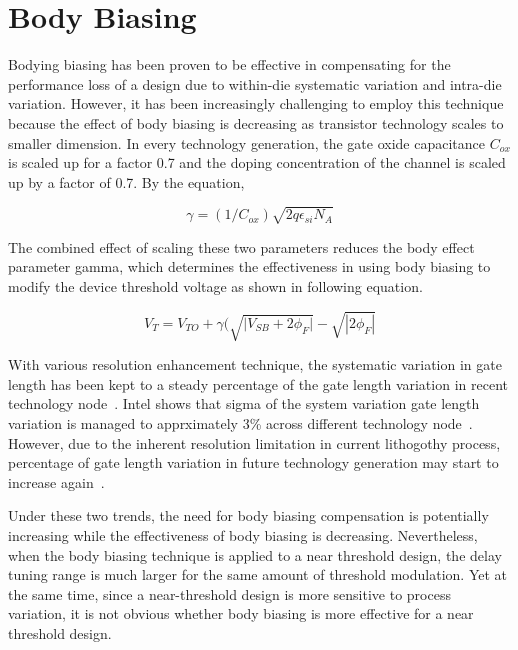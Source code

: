 \section{Body Biasing}
\label{sec:bodybiasing}

Bodying biasing has been proven to be effective in compensating for the
performance loss of a design due to within-die systematic variation and
intra-die variation. However, it has been increasingly challenging to employ
this technique because the effect of body biasing is decreasing as transistor
technology scales to smaller dimension. In every technology generation, the gate
oxide capacitance $C_{ox}$ is scaled up for a factor 0.7 and the doping
concentration of the channel is scaled up by a factor of 0.7. By the equation,

\begin{equation}
\gamma = (1/C_{ox})\sqrt{2q\epsilon_{si}N_A}
\end{equation}

The combined effect of scaling these two parameters reduces the body effect
parameter gamma, which determines the effectiveness in using body biasing to
modify the device threshold voltage as shown in following equation.

\begin{equation}
V_{T} = V_{TO} + \gamma ( \sqrt{ | {V_{SB} + 2\phi_{F} | } } - \sqrt{ | 2\phi_{F} | } 
\end{equation}

With various resolution enhancement technique, the systematic variation in gate length has been kept to a steady percentage of the gate length variation in recent technology node~\cite{Intel:2009}. Intel shows that sigma of the system variation gate length variation is managed to apprximately 3\% across different technology node~\cite{Intel:2009}. However, due to the inherent resolution limitation in current lithogothy process, percentage of gate length variation in future technology generation may start to increase again~\cite{OPC20}.    


Under these two trends, the need for body biasing compensation is potentially increasing
while the effectiveness of body biasing is decreasing. Nevertheless, when the
body biasing technique is applied to a near threshold design, the delay tuning
range is much larger for the same amount of threshold modulation. Yet at the
same time, since a near-threshold design is more sensitive to process variation,
it is not obvious whether body biasing is more effective for a near threshold
design. 

